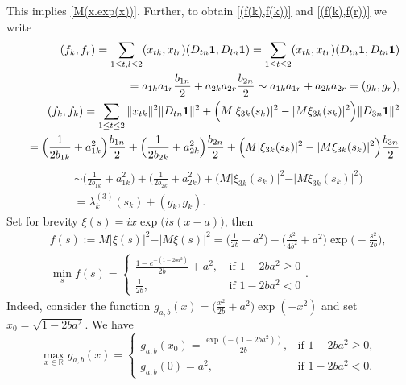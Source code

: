 \documentclass[preprint,12pt]{elsarticle}
\numberwithin{equation}{section}
\begin{document}
\begin{pf}
This implies \eqref{M(x.exp(x))}. Further, to obtain  \eqref{(f(k),f(k))} and \eqref{(f(k),f(r))} we write
\begin{eqnarray*}
 &&(f_k,f_r)=\sum_{1\leq t,l\leq 2}(x_{tk},x_{lr})(D_{tn}{\bf 1},D_{ln}{\bf 1})=
 \sum_{1\leq t\leq 2}(x_{tk},x_{tr})(D_{tn}{\bf 1},D_{tn}{\bf 1})
 \\
 &&=a_{1k}a_{1r}\frac{b_{1n}}{2}+a_{2k}a_{2r}\frac{b_{2n}}{2}\sim a_{1k}a_{1r}+a_{2k}a_{2r}=(g_k,g_r),\\
&& (f_k,f_k)=\sum_{1\leq t\leq 2}\Vert x_{tk}\Vert^2 \Vert D_{tn}{\bf 1}\Vert^2+
\Big(M\vert\xi_{3k}(s_k)\vert^2-\vert M\xi_{3k}(s_k)\vert^2\Big)\Vert D_{3n}{\bf 1}\Vert^2\\
&&=\Big(\frac{1}{2b_{1k}}+a_{1k}^2\Big)\frac{b_{1n}}{2}+
\Big(\frac{1}{2b_{2k}}+a_{2k}^2\Big)\frac{b_{2n}}{2}+\Big(M\vert\xi_{3k}(s_k)\vert^2-\vert M\xi_{3k}(s_k)\vert^2\Big)
\frac{b_{3n}}{2}
\end{eqnarray*}
\begin{eqnarray*}
&&\sim\Big(\frac{1}{2b_{1k}}+a_{1k}^2\Big)+\Big(\frac{1}{2b_{2k}}+a_{2k}^2\Big)+\Big(M \vert\xi_{3k}(s_k)\vert^2-\vert M\xi_{3k}(s_k)\vert^2\Big)\\
&&=\lambda_k^{(3)}(s_k)+(g_k,g_k).
\end{eqnarray*}
%
Set for brevity $\xi(s)=ix\exp\big(is(x-a)\big)$, then 
\begin{eqnarray}
\nonumber
 &&
 f(s):=M\vert \xi(s)\vert^2-\vert M\xi(s)\vert^2=\Big(\frac{1}{2b}+a^2\Big)-\Big(\frac{s^2}{4b^2}+a^2\Big)\exp\Big(-\frac{s^2}{2b}\Big),\\
 \label{min-s_k}
 &&
 \min_{s}f(s)=
  \left\{\begin{array}{ll}
\frac{1-e^{-(1-2ba^2)}}{2b}+a^2,&\,\text{if}\,\,1-2ba^2\geq 0\\
\frac{1}{2b},&\,\text{if}\,\,1-2ba^2<0
\end{array}\right..
\end{eqnarray}
Indeed, consider the function
$g_{a,b}(x)=\Big(\frac{x^2}{2b}+a^2\Big)\exp(-x^2)$ and set $x_0=\sqrt{1-2ba^2}$.
We have
\begin{equation}
\label{max-g(c,d)(x)}
\max_{x\in \mathbb R}g_{a,b}(x)\!=\!
 \left\{\begin{array}{ll}
g_{a,b}(x_0)= \frac{\exp(-(1-2ba^2))}{2b},
 &\text{if}\,\,1-2ba^2\geq 0,\\
g_{a,b}(0)= a^2,&\text{if}\,\,1-2ba^2<0.
\end{array}\right.
\end{equation}


\end{pf}
\end{document}
